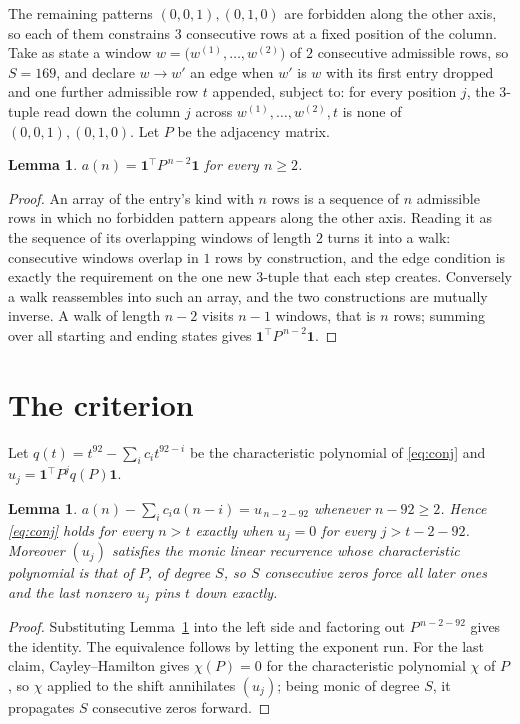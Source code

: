 \documentclass[11pt,a4paper]{article}
\theoremstyle{plain}
\newtheorem{lemma}[theorem]{Lemma}
\theoremstyle{definition}
\begin{document}
The remaining patterns $(0,0,1), (0,1,0)$ are forbidden along the other axis, so each of them
constrains $3$ consecutive rows at a fixed position of the column. Take as state a
window $w=\bigl(w^{(1)},\dots,w^{(2)}\bigr)$ of $2$ consecutive admissible
rows, so $S=169$, and declare $w\to w'$ an edge when $w'$ is $w$ with its first entry
dropped and one further admissible row $t$ appended, subject to: for every position
$j$, the $3$-tuple read down the column $j$ across $w^{(1)},\dots,w^{(2)},t$
is none of $(0,0,1), (0,1,0)$. Let $P$ be the adjacency matrix.

\begin{lemma}\label{lem:walk}
$a(n)=\mathbf{1}^{\!\top}P^{\,n-2}\mathbf{1}$ for every $n\ge2$.
\end{lemma}

\begin{proof}
An array of the entry's kind with $n$ rows is a sequence of $n$ admissible rows in
which no forbidden pattern appears along the other axis. Reading it as the sequence of its
overlapping windows of length $2$ turns it into a walk: consecutive windows overlap in
$1$ rows by construction, and the edge condition is exactly the requirement on the one
new $3$-tuple that each step creates. Conversely a walk reassembles into such an array,
and the two constructions are mutually inverse. A walk of length $n-2$ visits $n-1$
windows, that is $n$ rows; summing over all starting and ending states gives
$\mathbf{1}^{\!\top}P^{\,n-2}\mathbf{1}$.
\end{proof}

\section{The criterion}

Let $q(t)=t^{92}-\sum_i c_i t^{92-i}$ be the characteristic polynomial of
\eqref{eq:conj} and $u_j=\mathbf{1}^{\!\top}P^{j}q(P)\mathbf{1}$.

\begin{lemma}\label{lem:crit}
$a(n)-\sum_i c_i a(n-i)=u_{\,n-2-92}$ whenever $n-92\ge2$. Hence
\eqref{eq:conj} holds for every $n>t$ exactly when $u_j=0$ for every
$j>t-2-92$. Moreover $(u_j)$ satisfies the monic linear recurrence whose
characteristic polynomial is that of $P$, of degree $S$, so $S$ consecutive zeros force all
later ones and the last nonzero $u_j$ pins $t$ down exactly.
\end{lemma}

\begin{proof}
Substituting Lemma~\ref{lem:walk} into the left side and factoring out
$P^{\,n-2-92}$ gives the identity. The equivalence follows by letting the exponent
run. For the last claim, Cayley--Hamilton gives $\chi(P)=0$ for the characteristic
polynomial $\chi$ of $P$, so $\chi$ applied to the shift annihilates $(u_j)$; being monic of
degree $S$, it propagates $S$ consecutive zeros forward.
\end{proof}
\end{document}
